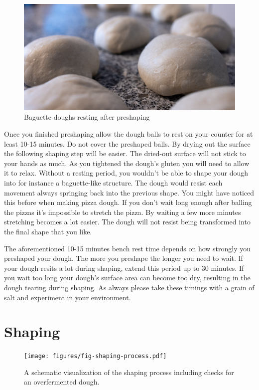 \begin{figure}[!htb]
  \includegraphics[width=\textwidth]{preshaped-dough}
  \caption{Baguette doughs resting after preshaping}
  \label{fig:dough-after-preshaping}
\end{figure}

Once you finished preshaping allow the dough balls to rest
on your counter for at least 10-15 minutes. Do not
cover the preshaped balls. By drying out the surface
the following shaping step will be easier. The dried-out surface
will not stick to your hands as much. As
you tightened the dough's gluten you will need to
allow it to relax. Without a resting period, you wouldn't
be able to shape your dough into for instance a baguette-like structure.
The dough would resist each movement
always springing back into the previous shape. You
might have noticed this before when making pizza dough. If you
don't wait long enough after balling the pizzas it's impossible
to stretch the pizza. By waiting a few more minutes
stretching becomes a lot easier. The dough will not resist
being transformed into the final shape that you like.

The aforementioned 10-15 minutes bench rest time depends
on how strongly you preshaped your dough. The more
you preshape the longer you need to wait. If your dough
resits a lot during shaping, extend this period up to 30 minutes.
If you wait too long your dough's surface area can become too dry,
resulting in the dough tearing during shaping. As always please
take these timings with a grain of salt and experiment in
your environment.

\section{Shaping}

\begin{figure}[!htb]
  \texttt{[image: figures/fig-shaping-process.pdf]}
  \caption{A schematic visualization of the shaping process including checks for an overfermented dough.}
  \label{fig:shaping-decision-tree}
\end{figure}

